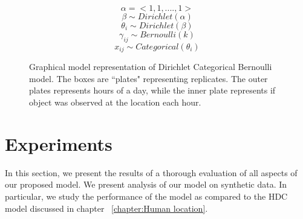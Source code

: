 \noindent
\begin{figure}[htp]
\qquad
\begin{minipage}{0.3\textwidth}
\centering


\end{minipage}%
\begin{minipage}{0.7\textwidth}

\begin{equation*}
	\alpha = <1, 1, .... , 1 > 
\end{equation*}
\begin{equation*}
	\beta \sim Dirichlet(\alpha)
\end{equation*}
\begin{equation*}
	\theta_i  \sim Dirichlet(\beta)
\end{equation*}
\begin{equation*}
	\gamma_{ij}  \sim Bernoulli(k)
\end{equation*}
\begin{equation*}
	x_{ij} \sim Categorical(\theta_i)
\end{equation*}
\end{minipage}

\caption[Dirichlet Categorical Bernoulli graphical model]{Graphical model representation of Dirichlet Categorical Bernoulli model. The boxes are ``plates" representing replicates. The outer plates represents hours of a day, while the inner plate represents if object was observed at the location each hour.}
\label{dcbm}
\end{figure}



\section{Experiments}

In this section, we present the results of a thorough evaluation of all aspects of our proposed model. We present  analysis of our model on synthetic data. In particular, we study the performance of the model as compared to the HDC model discussed in chapter ~\ref{chapter:Human location}.


